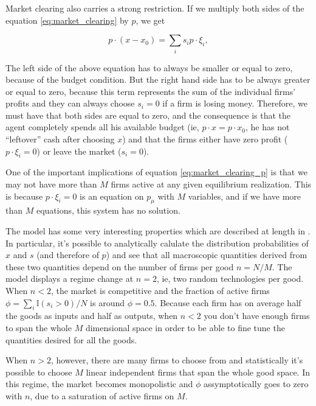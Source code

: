 Market clearing also carries a strong restriction. If we multiply both
sides of the equation \eqref{eq:market_clearing} by $p$, we get

\begin{equation}
  \label{eq:market_clearing_p}
  p\cdot (x - x_0) = \sum_i s_i p \cdot \xi_i,
\end{equation}

The left side of the above equation has to always be smaller or equal
to zero, because of the budget condition. But the right hand side has
to be always greater or equal to zero, because this term represents
the sum of the individual firms' profits and they can always choose
$s_i = 0$ if a firm is losing money. Therefore, we must have that both
sides are equal to zero, and the consequence is that the agent
completely spends all his available budget (ie,
$p\cdot x = p \cdot x_0$, he has not ``leftover'' cash after choosing
$x$) and that the firms either have zero profit ($p\cdot \xi_i = 0$)
or leave the market ($s_i = 0$).

One of the important implications of equation
\eqref{eq:market_clearing_p} is that we may not have more than $M$
firms active at any given equilibrium realization. This is because
$p\cdot \xi_i = 0$ is an equation on $p_\mu$ with $M$ variables, and
if we have more than $M$ equations, this system has no solution.

The model has some very interesting properties which are described at
length in \cite{DeMartinoMarsili04}. In particular, it's possible to
analytically calulate the distribution probabilities of $x$ and $s$
(and therefore of $p$) and see that all macroscopic quantities derived
from these two quantities depend on the number of firms per good
$n = N/M$. The model displays a regime change at $n=2$, ie, two random
technologies per good. When $n<2$, the market is competitive and the
fraction of active firms $\phi = \sum_i \mathbb{I}(s_i > 0) / N$ is
around $\phi = 0.5$. Because each firm has on average half the goods
as inputs and half as outputs, when $n<2$ you don't have enough firms
to span the whole $M$ dimensional space in order to be able to fine
tune the quantities desired for all the goods.

When $n>2$, however, there are many firms to choose from and
statistically it's possible to choose $M$ linear independent firms
that span the whole good space. In this regime, the market becomes
monopolistic and $\phi$ assymptotically goes to zero with $n$, due to
a saturation of active firms on $M$. 

